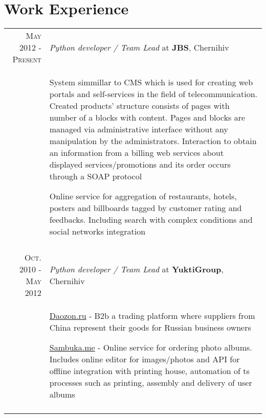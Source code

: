 \documentclass[a4paper,10pt]{article}
\begin{document}
\section{Work Experience}
\begin{tabular}{rp{11cm}}

  \textsc{May 2012 - Present} & \emph{Python developer / Team Lead} at \textbf{JBS}, Chernihiv\\
  & \begin{compactitem}
    \item System simmillar to CMS which is used for creating web portals and self-services in the field of telecommunication. Created products' structure consists of pages with number of a blocks with content. Pages and blocks are managed via administrative interface without any manipulation by the administrators. Interaction to obtain an information from a billing web services about displayed services/promotions and its order occurs through a SOAP protocol 
    \item Online service for aggregation of restaurants, hotels, posters and billboards tagged by customer rating and feedbacks. Including search with complex conditions and social networks integration
    \end{compactitem}\vspace{-1em} \\
\multicolumn{2}{c}{} \\

  \textsc{Oct. 2010 - May 2012} & \emph{Python developer / Team Lead} at \textbf{YuktiGroup}, Chernihiv\\
  & \begin{compactitem}
    \item \href{http://daozon.ru}{Daozon.ru} - B2b a trading platform where suppliers from China represent their goods for Russian business owners
    \item \href{http://sambuka.me}{Sambuka.me} - Online service for ordering photo albums. Includes online editor for images/photos and API for offline integration with printing house, automation of ts processes such as printing, assembly and delivery of user albums
    \end{compactitem}\vspace{-1em} \\
\multicolumn{2}{c}{} \\



\end{tabular}
\end{document}
